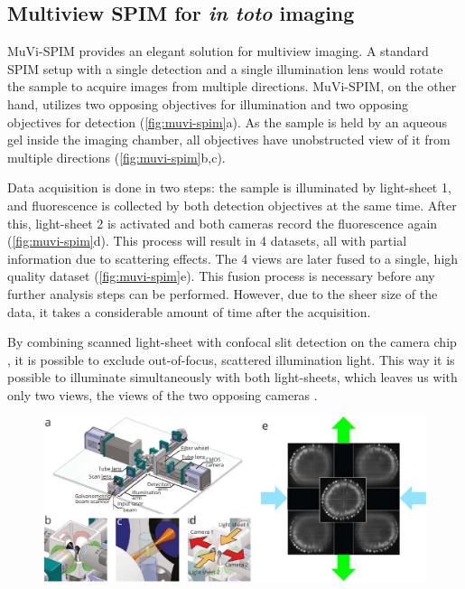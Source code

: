 \subsection{Multiview SPIM for \textit{in toto} imaging}

MuVi-SPIM  provides an elegant solution for multiview imaging. A standard SPIM setup with a single detection and a single illumination lens would rotate the sample to acquire images from multiple directions. MuVi-SPIM, on the other hand, utilizes two opposing objectives for illumination and two opposing objectives for detection (\autoref{fig:muvi-spim}a). As the sample is held by an aqueous gel inside the imaging chamber, all objectives have unobstructed view of it from multiple directions (\autoref{fig:muvi-spim}b,c).

Data acquisition is done in two steps: the sample is illuminated by light-sheet 1, and fluorescence is collected by both detection objectives at the same time. After this, light-sheet 2 is activated and both cameras record the fluorescence again (\autoref{fig:muvi-spim}d). This process will result in 4 datasets, all with partial information due to scattering effects. The 4 views are later fused to a single, high quality dataset (\autoref{fig:muvi-spim}e). This fusion process is necessary before any further analysis steps can be performed. However, due to the sheer size of the data, it takes a considerable amount of time after the acquisition.

By combining scanned light-sheet \cite{keller_reconstruction_2008} with confocal slit detection on the camera chip \cite{baumgart_scanned_2012}, it is possible to exclude out-of-focus, scattered illumination light. This way it is  possible to illuminate simultaneously with both light-sheets, which leaves us with only two views, the views of the two opposing cameras \cite{de_medeiros_confocal_2015}.

\begin{figure}
  \centering
  \includegraphics[width=1\columnwidth]{fusion/muvi-spim}
  \label{fig:muvi-spim}
\end{figure}




